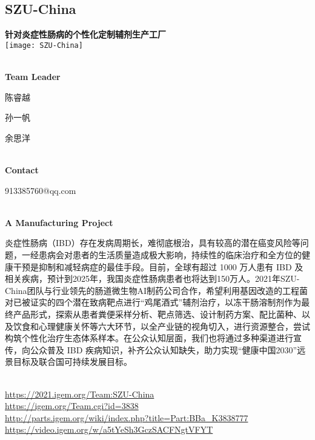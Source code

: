 \subsection{\textcolor{Blu}{ SZU-China } }
\vspace{5mm}
\begin{center}
\large{
  \textbf{ 针对炎症性肠病的个性化定制辅剂生产工厂 }\\
  \texttt{[image: SZU-China]}
}
\end{center}
\textbf{\\Team Leader}

  陈睿越

  孙一帆

  余思洋


\textbf{\\Contact}

  913385760@qq.com


\textbf{\\A Manufacturing Project\\}\begin{spacing}{1.5}

炎症性肠病（IBD）存在发病周期长，难彻底根治，具有较高的潜在癌变风险等问题，一经患病会对患者的生活质量造成极大影响，持续性的临床治疗和全方位的健康干预是抑制和减轻病症的最佳手段。目前，全球有超过 1000 万人患有 IBD 及相关疾病，预计到2025年，我国炎症性肠病患者也将达到150万人。2021年SZU-China团队与行业领先的肠道微生物AI制药公司合作，希望利用基因改造的工程菌对已被证实的四个潜在致病靶点进行“鸡尾酒式”辅剂治疗，以冻干肠溶制剂作为最终产品形式，探索从患者粪便采样分析、靶点筛选、设计制药方案、配比菌种、以及饮食和心理健康关怀等六大环节，以全产业链的视角切入，进行资源整合，尝试构筑个性化治疗生态体系样本。在公众认知层面，我们也将通过多种渠道进行宣传，向公众普及 IBD 疾病知识，补齐公众认知缺失，助力实现“健康中国2030”远景目标及联合国可持续发展目标。\end{spacing}
\\

\url{https://2021.igem.org/Team:SZU-China }\\
\url{https://igem.org/Team.cgi?id=3838 }\\
\url{http://parts.igem.org/wiki/index.php?title=Part:BBa_K3838777 }\\
\url{https://video.igem.org/w/a5tYeSh3GczSACFNgtVFYT }\\

\vfill{}









